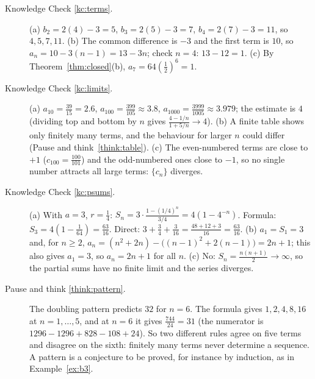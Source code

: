 \documentclass[11pt]{article}
\begin{document}
\begin{description}
  \item[Knowledge Check \ref{kc:terms}.] (a) $b_2=2(4)-3=5$, $b_3=2(5)-3=7$, $b_4=2(7)-3=11$, so $4,5,7,11$. (b) The common difference is $-3$ and the first term is $10$, so $a_n=10-3(n-1)=13-3n$; check $n=4$: $13-12=1$. (c) By Theorem~\ref{thm:closed}(b), $a_7=64\left(\frac12\right)^6=1$.
  \item[Knowledge Check \ref{kc:limits}.] (a) $a_{10}=\frac{39}{15}=2.6$, $a_{100}=\frac{399}{105}\approx3.8$, $a_{1000}=\frac{3999}{1005}\approx3.979$; the estimate is $4$ (dividing top and bottom by $n$ gives $\frac{4-1/n}{1+5/n}\to4$). (b) A finite table shows only finitely many terms, and the behaviour for larger $n$ could differ (Pause and think~\ref{think:table}). (c) The even-numbered terms are close to $+1$ ($c_{100}=\frac{100}{101}$) and the odd-numbered ones close to $-1$, so no single number attracts all large terms: $\{c_n\}$ diverges.
  \item[Knowledge Check \ref{kc:psums}.] (a) With $a=3$, $r=\frac14$: $S_n=3\cdot\frac{1-(1/4)^n}{3/4}=4\left(1-4^{-n}\right)$. Formula: $S_3=4\left(1-\frac1{64}\right)=\frac{63}{16}$. Direct: $3+\frac34+\frac3{16}=\frac{48+12+3}{16}=\frac{63}{16}$. (b) $a_1=S_1=3$ and, for $n\ge2$, $a_n=(n^2+2n)-\big((n-1)^2+2(n-1)\big)=2n+1$; this also gives $a_1=3$, so $a_n=2n+1$ for all $n$. (c) No: $S_n=\frac{n(n+1)}2\to\infty$, so the partial sums have no finite limit and the series diverges.
  \item[Pause and think \ref{think:pattern}.] The doubling pattern predicts $32$ for $n=6$. The formula gives $1,2,4,8,16$ at $n=1,\dots,5$, and at $n=6$ it gives $\frac{744}{24}=31$ (the numerator is $1296-1296+828-108+24$). So two different rules agree on five terms and disagree on the sixth: finitely many terms never determine a sequence. A pattern is a conjecture to be proved, for instance by induction, as in Example~\ref{ex:b3}.

\end{description}
\end{document}
